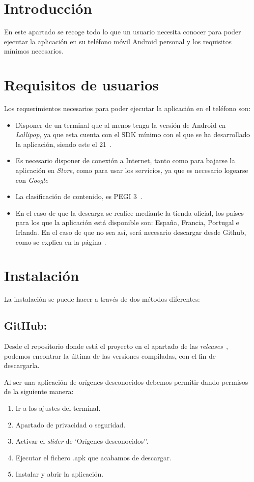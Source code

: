 
\section{Introducción}
En este apartado se recoge todo lo que un usuario necesita conocer para poder ejecutar la aplicación en su teléfono móvil Android personal y los requisitos mínimos necesarios.

\section{Requisitos de usuarios}
Los requerimientos necesarios para poder ejecutar la aplicación en el teléfono son:
\begin{itemize}
	\tightlist
	\item
	Disponer de un terminal que al menos tenga la versión de Android en \emph{Lollipop}, ya que esta cuenta con el SDK mínimo con el que se ha desarrollado la aplicación, siendo este el 21~\cite{wiki:versionAndroid}.
	\item
	Es necesario disponer de conexión a Internet, tanto como para bajarse la aplicación en \emph{Store}, como para usar los servicios, ya que es necesario logearse con \emph{Google}
	\item La clasificación de contenido, es PEGI 3~\cite{wiki:pegi}. 
	\item En el caso de que la descarga se realice mediante la tienda oficial, los países para los que la aplicación está disponible son: España, Francia, Portugal e Irlanda. En el caso de que no sea así, será necesario descargar desde Github, como se explica en la página~\pageref{descargaGit}.
\end{itemize}

\section{Instalación}
La instalación se puede hacer a través de dos métodos diferentes:

\subsection{GitHub:}\label{descargaGit}
Desde el repositorio donde está el proyecto en el apartado de las \emph{releases}~\cite{github:releases}, podemos encontrar la última de las versiones compiladas, con el fin de descargarla.

Al ser una aplicación de orígenes desconocidos debemos permitir dando permisos de la siguiente manera:
\begin{enumerate}
	\tightlist
	\item Ir a los ajustes del terminal.
	\item Apartado de privacidad o seguridad.
	\item Activar el \emph{slider} de `Orígenes desconocidos''.
	\item Ejecutar el fichero .apk que acabamos de descargar.
	\item Instalar y abrir la aplicación.
\end{enumerate}

